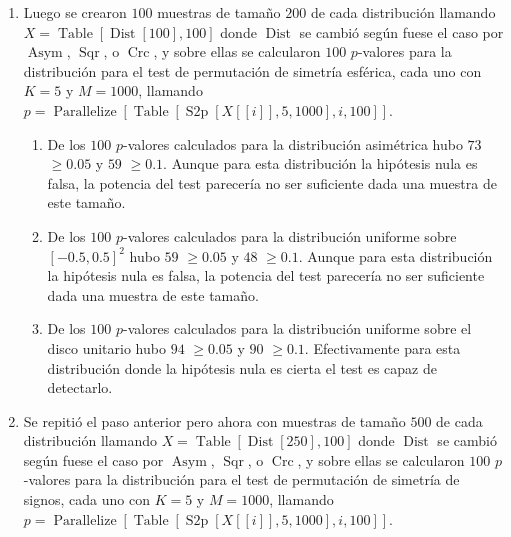 \documentclass[letter]{article}
\begin{document}
\begin{enumerate}
\begin{enumerate}[label=(\roman*)]
\end{enumerate}

\item Luego se crearon $100$ muestras de tamaño $200$ de cada distribución llamando $X = \operatorname{Table}[\operatorname{Dist}[100],100]$ donde $\operatorname{Dist}$ se cambió según fuese el caso por $\operatorname{Asym}$, $\operatorname{Sqr}$, o $\operatorname{Crc}$, y sobre ellas se calcularon $100$ $p$-valores para la distribución para el test de permutación de simetría esférica, cada uno con $K = 5$ y $M = 1000$, llamando $p = \operatorname{Parallelize}[\operatorname{Table}[\operatorname{S2p}[X[[i]],5,1000],{i,100}]]$.

\begin{enumerate}[label=(\roman*)]

\item De los $100$ $p$-valores calculados para la distribución asimétrica hubo $73$ $\geq 0.05$ y $59$ $\geq 0.1$. Aunque para esta distribución la hipótesis nula es falsa, la potencia del test parecería no ser suficiente dada una muestra de este tamaño.

\item De los $100$ $p$-valores calculados para la distribución uniforme sobre $[-0.5,0.5]^2$ hubo $59$ $\geq 0.05$ y $48$ $\geq 0.1$. Aunque para esta distribución la hipótesis nula es falsa, la potencia del test parecería no ser suficiente dada una muestra de este tamaño.

\item De los $100$ $p$-valores calculados para la distribución uniforme sobre el disco unitario hubo $94$ $\geq 0.05$ y $90$ $\geq 0.1$. Efectivamente para esta distribución donde la hipótesis nula es cierta el test es capaz de detectarlo.

\end{enumerate}

\item Se repitió el paso anterior pero ahora con muestras de tamaño $500$ de cada distribución llamando $X = \operatorname{Table}[\operatorname{Dist}[250],100]$ donde $\operatorname{Dist}$ se cambió según fuese el caso por $\operatorname{Asym}$, $\operatorname{Sqr}$, o $\operatorname{Crc}$, y sobre ellas se calcularon $100$ $p$-valores para la distribución para el test de permutación de simetría de signos, cada uno con $K = 5$ y $M = 1000$, llamando $p = \operatorname{Parallelize}[\operatorname{Table}[\operatorname{S2p}[X[[i]],5,1000],{i,100}]]$.

\begin{enumerate}[label=(\roman*)]


\end{enumerate}
\end{enumerate}
\end{document}
